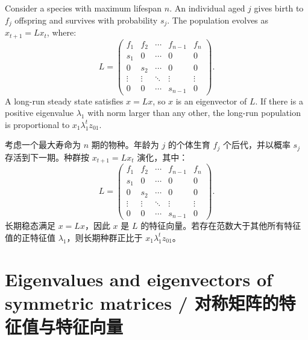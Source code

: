 \begin{original}
Consider a species with maximum lifespan $n$. An individual aged $j$ gives birth to $f_j$ offspring and survives with probability $s_j$. The population evolves as $x_{t+1} = L x_t$, where:
\[
L = \begin{pmatrix}
f_1 & f_2 & \cdots & f_{n-1} & f_n \\
s_1 & 0 & \cdots & 0 & 0 \\
0 & s_2 & \cdots & 0 & 0 \\
\vdots & \vdots & \ddots & \vdots & \vdots \\
0 & 0 & \cdots & s_{n-1} & 0
\end{pmatrix}.
\]
A long-run steady state satisfies $x = Lx$, so $x$ is an eigenvector of $L$. If there is a positive eigenvalue $\lambda_1$ with norm larger than any other, the long-run population is proportional to $x_1 \lambda_1^t z_{01}$.
\end{original}
\begin{translation}
考虑一个最大寿命为 $n$ 期的物种。年龄为 $j$ 的个体生育 $f_j$ 个后代，并以概率 $s_j$ 存活到下一期。种群按 $x_{t+1} = L x_t$ 演化，其中：
\[
L = \begin{pmatrix}
f_1 & f_2 & \cdots & f_{n-1} & f_n \\
s_1 & 0 & \cdots & 0 & 0 \\
0 & s_2 & \cdots & 0 & 0 \\
\vdots & \vdots & \ddots & \vdots & \vdots \\
0 & 0 & \cdots & s_{n-1} & 0
\end{pmatrix}.
\]
长期稳态满足 $x = Lx$，因此 $x$ 是 $L$ 的特征向量。若存在范数大于其他所有特征值的正特征值 $\lambda_1$，则长期种群正比于 $x_1 \lambda_1^t z_{01}$。
\end{translation}

\section{Eigenvalues and eigenvectors of symmetric matrices / 对称矩阵的特征值与特征向量}

